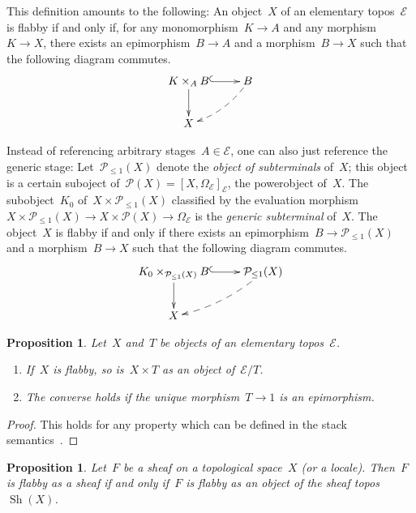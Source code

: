 \documentclass[oneside]{amsart}
\theoremstyle{definition}
\theoremstyle{plain}
\newtheorem{prop}[defn]{Proposition}
\theoremstyle{remark}
\newcommand{\E}{\mathcal{E}}
\renewcommand{\P}{\mathcal{P}}
\DeclareMathOperator{\Sh}{Sh}
\renewcommand{\_}{\mathpunct{.}\,}
\begin{document}
This definition amounts to the following: An object~$X$ of an elementary
topos~$\E$ is flabby if and only if, for any monomorphism~$K \to A$ and any
morphism~$K \to X$, there exists an epimorphism~$B \to A$ and a morphism~$B
\to X$ such that the following diagram commutes.
\[ \xymatrix{
  K \times_A B \ar@{^{(}->}[r]\ar[d] & B \ar@{-->}@/^/[ld] \\
  X
} \]

Instead of referencing arbitrary stages~$A \in \E$, one can also just reference
the generic stage: Let~$\P_{\leq1}(X)$ denote the \emph{object of subterminals}
of~$X$; this object is a certain suboject of~$\P(X) = [X,\Omega_\E]_\E$, the
powerobject of~$X$. The subobject~$K_0$ of~$X \times \P_{\leq1}(X)$ classified by the
evaluation morphism~$X \times \P_{\leq1}(X) \to X \times \P(X) \to \Omega_\E$
is the \emph{generic subterminal} of~$X$. The object~$X$ is flabby if and only
if there exists an epimorphism~$B \to \P_{\leq1}(X)$ and a morphism~$B \to X$
such that the following diagram commutes.
\[ \xymatrix{
  K_0 \times_{\P_{\leq1}(X)} B \ar@{^{(}->}[r]\ar[d] & \P_{\leq1}(X) \ar@{-->}@/^/[ld] \\
  X
} \]

\begin{prop}\label{prop:basic-properties-of-flabby-objects}
Let~$X$ and~$T$ be objects of an elementary topos~$\E$.
\begin{enumerate}
\item If~$X$ is flabby, so is~$X \times T$ as an object of~$\E/T$.
\item The converse holds if the unique morphism~$T \to 1$ is an epimorphism.
\end{enumerate}
\end{prop}

\begin{proof}This holds for any property which can be defined
in the stack semantics~\cite[Lemma~7.3]{shulman:stack-semantics}.
\end{proof}

\begin{prop}\label{prop:flabby-sheaves-objects}
Let~$F$ be a sheaf on a topological space~$X$ (or a locale).
Then~$F$ is flabby as a sheaf if and only if~$F$ is flabby as an object of the
sheaf topos~$\Sh(X)$.
\end{prop}
\end{document}
